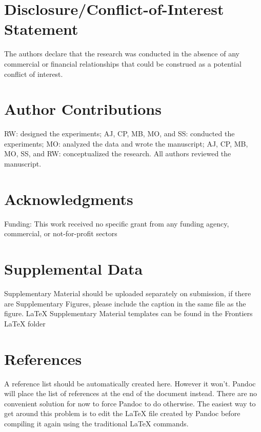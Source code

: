 \documentclass[utf8]{frontiersSCNS}
\begin{document}
\hypertarget{disclosureconflict-of-interest-statement}{%
\section*{Disclosure/Conflict-of-Interest
Statement}\label{disclosureconflict-of-interest-statement}}

The authors declare that the research was conducted in the absence of
any commercial or financial relationships that could be construed as a
potential conflict of interest.

\hypertarget{author-contributions}{%
\section*{Author Contributions}\label{author-contributions}}

RW: designed the experiments; AJ, CP, MB, MO, and SS: conducted the
experiments; MO: analyzed the data and wrote the manuscript; AJ, CP, MB,
MO, SS, and RW: conceptualized the research. All authors reviewed the
manuscript.

\hypertarget{acknowledgments}{%
\section*{Acknowledgments}\label{acknowledgments}}

Funding: This work received no specific grant from any funding agency,
commercial, or not-for-profit sectors

\hypertarget{supplemental-data}{%
\section{Supplemental Data}\label{supplemental-data}}

Supplementary Material should be uploaded separately on submission, if
there are Supplementary Figures, please include the caption in the same
file as the figure. LaTeX Supplementary Material templates can be found
in the Frontiers LaTeX folder

\hypertarget{references}{%
\section{References}\label{references}}

A reference list should be automatically created here. However it won't.
Pandoc will place the list of references at the end of the document
instead. There are no convenient solution for now to force Pandoc to do
otherwise. The easiest way to get around this problem is to edit the
LaTeX file created by Pandoc before compiling it again using the
traditional LaTeX commands.
\end{document}
